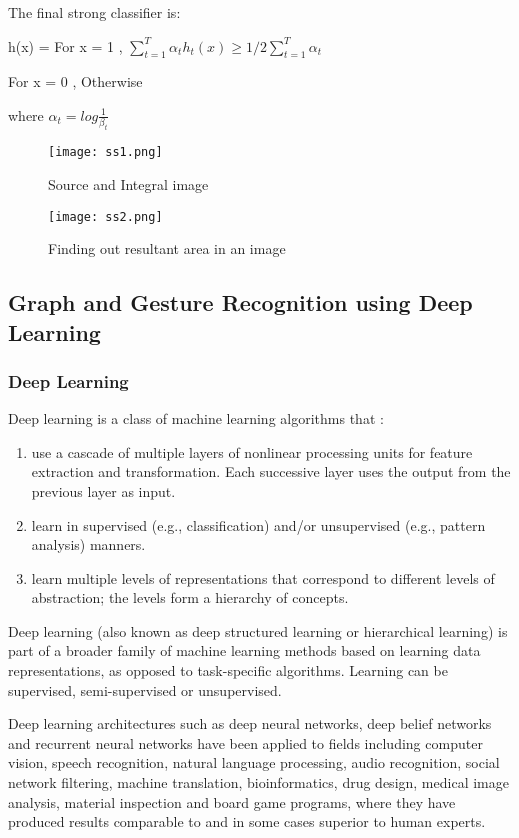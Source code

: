 \documentclass[12pt,a4paper]{article}
\begin{document}
\newpage
The final strong classifier is: 
\par 
h(x) = For x = 1 , ${{\sum_{t=1}^{T}}\alpha_{t}h_{t}(x) \geq 1/2 {\sum_{t=1}^{T}} \alpha_{t}}$ 
\par 
For x = 0 , Otherwise
\par 
where $\alpha_{t} = log \frac{1}{\beta_{t}}$

\begin{figure}[h]
	\centering
	\texttt{[image: ss1.png]}
	\caption{Source and Integral image}
\end{figure}

\begin{figure}[h]
	\centering
	\texttt{[image: ss2.png]}
	\caption{Finding out resultant area in an image}
\end{figure}

\newpage
\begin{center}
\section{Graph and Gesture Recognition using Deep Learning}
\end{center}

\subsubsection{Deep Learning}
Deep learning is a class of machine learning algorithms that :
\begin{enumerate}
\item use a cascade of multiple layers of nonlinear processing units for feature extraction and transformation. Each successive layer uses the output from the previous layer as input.
\item learn in supervised (e.g., classification) and/or unsupervised (e.g., pattern analysis) manners.
\item learn multiple levels of representations that correspond to different levels of abstraction; the levels form a hierarchy of concepts. 
\end{enumerate}

\par 
Deep learning (also known as deep structured learning or hierarchical learning) is part of a broader family of machine learning methods based on learning data representations, as opposed to task-specific algorithms. Learning can be supervised, semi-supervised or unsupervised.

Deep learning architectures such as deep neural networks, deep belief networks and recurrent neural networks have been applied to fields including computer vision, speech recognition, natural language processing, audio recognition, social network filtering, machine translation, bioinformatics, drug design, medical image analysis, material inspection and board game programs, where they have produced results comparable to and in some cases superior to human experts.
\end{document}
